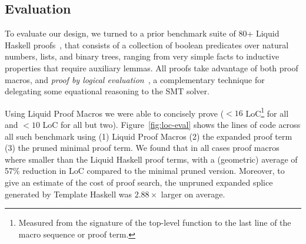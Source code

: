 \subsection{Evaluation}
\label{sec:eval-eval}

To evaluate our design, we turned to a prior benchmark suite of 80+
Liquid Haskell proofs~\cite{TacticThesis}, that consists of a
collection of boolean predicates over natural numbers, lists, and
binary trees, ranging from very simple facts to inductive properties
that require auxiliary lemmas. All proofs take advantage of both proof
macros, and {\em proof by logical evaluation}~\cite{VazouTCSNWJ18}, a
complementary technique for delegating some equational reasoning to
the SMT solver.

Using Liquid Proof Macros we were able to concisely prove ($<16$
LoC\footnote{Measured from the signature of the top-level function to the last
line of the macro sequence or proof term.} for all and $<10$ LoC for all but
two). Figure~\ref{fig:loc-eval} shows the lines of code across all such
benchmark using (1) Liquid Proof Macros (2) the expanded proof term (3) the
pruned minimal proof term. We found that in all cases proof macros where smaller
than the Liquid Haskell proof terms, with a (geometric) average of 57\%
reduction in LoC compared to the minimal pruned version. Moreover, to give an
estimate of the cost of proof search, the unpruned expanded splice generated by
Template Haskell was $2.88\times$ larger on average.


